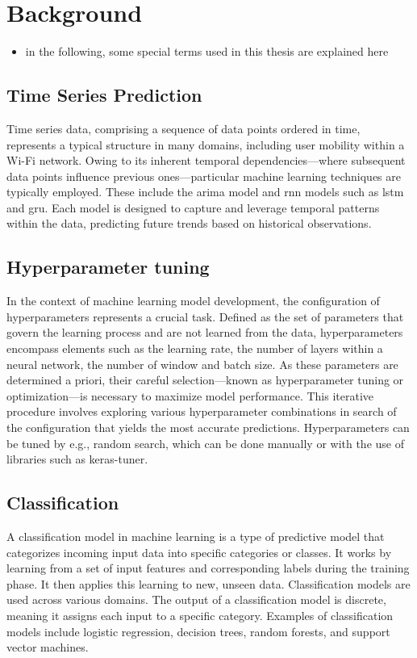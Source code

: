 \chapter{Background}\label{sec:background}

\begin{itemize}
    \item in the following, some special terms used in this thesis are explained here
\end{itemize}

\section{Time Series Prediction}
Time series data, comprising a sequence of data points ordered in time, represents a typical structure in many domains, including user mobility within a Wi-Fi network.
Owing to its inherent temporal dependencies—where subsequent data points influence previous ones—particular machine learning techniques are typically employed.
These include the \ac{arima} model and \ac{rnn} models such as \ac{lstm} and \ac{gru}.
Each model is designed to capture and leverage temporal patterns within the data, predicting future trends based on historical observations.

\section{Hyperparameter tuning}
In the context of machine learning model development, the configuration of hyperparameters represents a crucial task.
Defined as the set of parameters that govern the learning process and are not learned from the data, hyperparameters encompass elements such as the learning rate, the number of layers within a neural network, the number of window and batch size.
As these parameters are determined a priori, their careful selection—known as hyperparameter tuning or optimization—is necessary to maximize model performance.
This iterative procedure involves exploring various hyperparameter combinations in search of the configuration that yields the most accurate predictions.
Hyperparameters can be tuned by e.g., random search, which can be done manually or with the use of libraries such as keras-tuner.

\section{Classification}

A classification model in machine learning is a type of predictive model that categorizes incoming input data into specific categories or classes.
It works by learning from a set of input features and corresponding labels during the training phase.
It then applies this learning to new, unseen data.
Classification models are used across various domains.
The output of a classification model is discrete, meaning it assigns each input to a specific category.
Examples of classification models include logistic regression, decision trees, random forests, and support vector machines.


